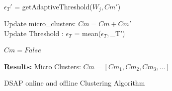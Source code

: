 \documentclass[../UNBThesis2.tex]{subfiles}
\begin{document}
\begin{algorithm}[htbp]
{{         %
         {                                  \hfill {}\\
                $\epsilon_T'$ = getAdaptiveThreshold($W_j,Cm'$)

         }

        Update micro\_clusters: $Cm = Cm + Cm'$ \\
        Update Threshold : $\epsilon_T$ = mean($\epsilon_T, $\epsilon_T')
        
        

      }
       
        {$Cm = False$}
         
        \textbf{Results: } Micro Clusters: $Cm= [Cm_1,Cm_2,Cm_3, ...]$ %
        }
            

         
       
\caption{DSAP online and offline Clustering Algorithm}
    \label{algSDAPi}
\end{algorithm}
\end{document}
